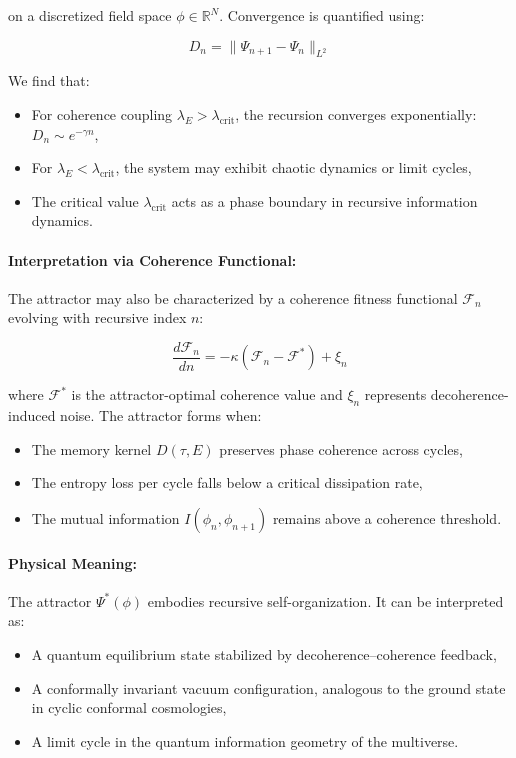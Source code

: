 \noindent
on a discretized field space \( \phi \in \mathbb{R}^N \). Convergence is quantified using:

\begin{equation}
D_n = \| \Psi_{n+1} - \Psi_n \|_{L^2}
\end{equation}

We find that:
\begin{itemize}
    \item For coherence coupling \( \lambda_E > \lambda_{\text{crit}} \), the recursion converges exponentially: \( D_n \sim e^{-\gamma n} \),
    \item For \( \lambda_E < \lambda_{\text{crit}} \), the system may exhibit chaotic dynamics or limit cycles,
    \item The critical value \( \lambda_{\text{crit}} \) acts as a phase boundary in recursive information dynamics.
\end{itemize}

\paragraph{Interpretation via Coherence Functional:}

The attractor may also be characterized by a coherence fitness functional \( \mathcal{F}_n \) evolving with recursive index \( n \):

\begin{equation}
\frac{d\mathcal{F}_n}{dn} = -\kappa(\mathcal{F}_n - \mathcal{F}^*) + \xi_n
\end{equation}

where \( \mathcal{F}^* \) is the attractor-optimal coherence value and \( \xi_n \) represents decoherence-induced noise. The attractor forms when:
\begin{itemize}
    \item The memory kernel \( D(\tau, E) \) preserves phase coherence across cycles,
    \item The entropy loss per cycle falls below a critical dissipation rate,
    \item The mutual information \( I(\phi_n, \phi_{n+1}) \) remains above a coherence threshold.
\end{itemize}

\paragraph{Physical Meaning:}

The attractor \( \Psi^*(\phi) \) embodies recursive self-organization. It can be interpreted as:
\begin{itemize}
    \item A quantum equilibrium state stabilized by decoherence–coherence feedback,
    \item A conformally invariant vacuum configuration, analogous to the ground state in cyclic conformal cosmologies,
    \item A limit cycle in the quantum information geometry of the multiverse.
\end{itemize}

